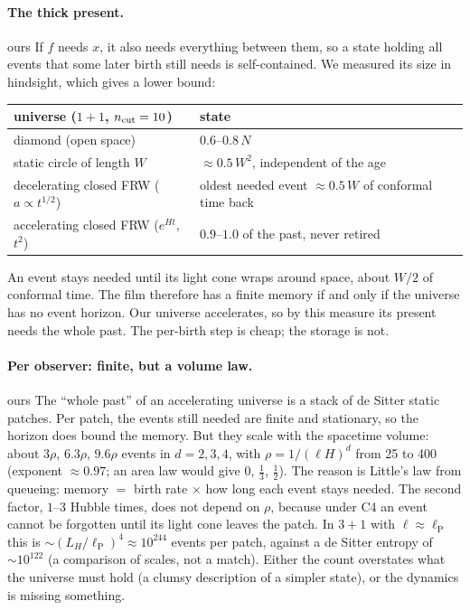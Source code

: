 \documentclass[11pt,a4paper]{article}
\newcommand{\tagbox}[2]{\textsf{\scriptsize\colorbox{#1!12}{\textcolor{#1!70!black}{#2}}}}
\newcommand{\ours}{\tagbox{orange}{ours}}
\newcommand{\lP}{\ell_{\mathrm P}}
\begin{document}
\paragraph{The thick present.} \ours{} If $f$ needs $x$, it also needs everything between them, so a state holding all events that some later birth still needs is self-contained. We measured its size in hindsight, which gives a lower bound:
\begin{center}\small
\begin{tabular}{@{}ll@{}}
\toprule
universe ($1+1$, $n_{\rm cut}=10$) & state\\
\midrule
diamond (open space) & $0.6$--$0.8\,N$\\
static circle of length $W$ & $\approx0.5\,W^2$, independent of the age\\
decelerating closed FRW ($a\propto t^{1/2}$) & oldest needed event $\approx0.5\,W$ of conformal time back\\
accelerating closed FRW ($e^{Ht}$, $t^2$) & $0.9$--$1.0$ of the past, never retired\\
\bottomrule
\end{tabular}
\end{center}
An event stays needed until its light cone wraps around space, about $W/2$ of conformal time. The film therefore has a finite memory if and only if the universe has no event horizon. Our universe accelerates, so by this measure its present needs the whole past. The per-birth step is cheap; the storage is not.

\paragraph{Per observer: finite, but a volume law.} \ours{} The ``whole past'' of an accelerating universe is a stack of de Sitter static patches. Per patch, the events still needed are finite and stationary, so the horizon does bound the memory. But they scale with the spacetime volume: about $3\rho$, $6.3\rho$, $9.6\rho$ events in $d=2,3,4$, with $\rho=1/(\ell H)^d$ from 25 to 400 (exponent $\approx0.97$; an area law would give $0$, $\tfrac13$, $\tfrac12$). The reason is Little's law from queueing: memory $=$ birth rate $\times$ how long each event stays needed. The second factor, $1$--$3$ Hubble times, does not depend on $\rho$, because under C4 an event cannot be forgotten until its light cone leaves the patch. In $3+1$ with $\ell\approx\lP$ this is $\sim(L_H/\lP)^4\approx10^{244}$ events per patch, against a de Sitter entropy of $\sim10^{122}$ (a comparison of scales, not a match). Either the count overstates what the universe must hold (a clumsy description of a simpler state), or the dynamics is missing something.
\end{document}
